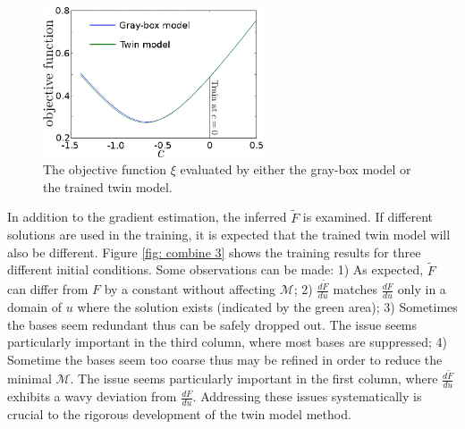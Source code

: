 \begin{figure}[htbp]\begin{center}
    \includegraphics[width=6.5cm]{../J_twin_vs_primal.png}
    \caption{The objective function $\xi$ evaluated by either the gray-box model
             or the trained twin model.}
    \label{fig: objective ad hoc}
\end{center}\end{figure}

In addition to the gradient estimation, the inferred $\tilde{F}$ is examined.
If different solutions are used in the training, it is expected
that the trained twin model  will also be different.
Figure \ref{fig: combine 3} shows the training results for three different initial conditions.
Some observations can be made: 1) As expected, $\tilde{F}$ can differ from $F$ by a constant without
affecting $\mathcal{M}$; 2) $\frac{d\tilde{F}}{du}$ matches $\frac{dF}{du}$ only in a
domain of $u$ where the solution exists (indicated by the green area);
3) Sometimes the bases seem redundant thus can be safely dropped out. The issue seems particularly 
important in the third column, where most bases are suppressed;
4) Sometime the bases seem too coarse thus may be refined in order to reduce the minimal $\mathcal{M}$. 
The issue seems particularly important in the first column, where $\frac{d\tilde{F}}{du}$ exhibits
a wavy deviation from $\frac{dF}{du}$. 
Addressing these issues systematically is crucial to the rigorous development of
the twin model method.\\

